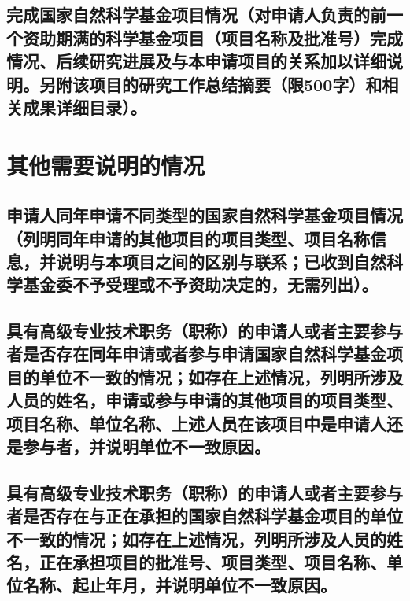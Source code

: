 \documentclass[UTF8, punct, oneside,fontset=none]{ctexbook}
\begin{document}
\begin{MS}
	
\end{MS}


\section{\textbf{完成国家自然科学基金项目情况}\kg{0.2em}（对申请人负责的前一个资助期满的科学基金项目（项目名称及批准号）完成情况、后续研究进展及与本申请项目的关系加以详细说明。另附该项目的研究工作总结摘要（限500字）和相关成果详细目录）。}

\begin{MS}
	
\end{MS}

\chapter{\textbf{其他需要说明的情况}}
\section{申请人同年申请不同类型的国家自然科学基金项目情况\kg{0.2em}（列明同年申请的其他项目的项目类型、项目名称信息，并说明与本项目之间的区别与联系；已收到自然科学基金委不予受理或不予资助决定的，无需列出）。}

\begin{MS}
	
\end{MS}

\section{具有高级专业技术职务\kg{0.3em}（职称）\kg{0.3em}的申请人或者主要参与者是否存在同年申\kg{0.1em}请\kg{0.1em}或者\kg{0.1em}参与申请国家自然科学基金项目的单位不一致的情况；如存在上述情况，列明所涉及人员的姓名，申请或参与申请的其他项目的项目类型、项目名称、单位名称、上述人员在该项目中是申请人还是参与者，并说明单位不一致原因。}

\begin{MS}
	
\end{MS}

\section{具有高级专业技术职务\kg{0.3em}（职称）\kg{0.3em}的申请人或者主要参与者是否存在与正在承担的国家自然科学基金项目的单位不一致的情况；如存在上述情况，列明所涉及人员的姓名，正在承担项目的批准号、项目类型、项目名称、单位名称、起止年月，并说明单位不一致原因。}
\end{document}
